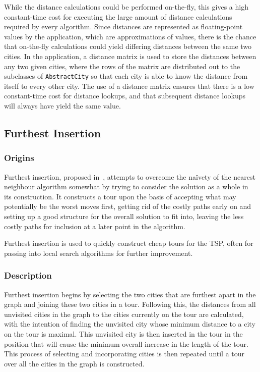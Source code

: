 \documentclass{l4proj}
\begin{document}
While the distance calculations could be performed on-the-fly, this gives a high constant-time cost for executing the large amount 
of distance calculations required by every algorithm. Since distances are represented as floating-point values by the application, 
which are approximations of values, there is the chance that on-the-fly calculations could yield differing distances between the same 
two cities. In the application, a distance matrix is used to store the distances between any two given cities, where the rows of the 
matrix are distributed out to the subclasses of \texttt{AbstractCity} so that each city is able to know the distance from itself to 
every other city. The use of a distance matrix ensures that there is a low constant-time cost for distance lookups, and that subsequent 
distance lookups will always have yield the same value.


\subsection{Furthest Insertion}
\subsubsection{Origins}
Furthest insertion, proposed in~\cite{travelIBM}, attempts to overcome the na\"ivety of the nearest neighbour algorithm somewhat by trying to consider the solution as a whole in its construction. It constructs a tour upon the basis of accepting what may potentially be the worst moves first, getting rid of the costly paths early on and setting up a good structure for the overall solution to fit into, leaving the less costly paths for inclusion at a later point in the algorithm.

Furthest insertion is used to quickly construct cheap tours for the TSP, often for passing into local search algorithms for further improvement.

\subsubsection{Description}
\label{fi_desc}
Furthest insertion begins by selecting the two cities that are furthest apart in the graph and joining these two cities in a tour. Following this, the distances from all unvisited cities in the graph to the cities currently on the tour are calculated, with the intention of finding the unvisited city whose minimum distance to a city on the tour is maximal. This unvisited city is then inserted in the tour in the position that will cause the minimum overall increase in the length of the tour. This process of selecting and incorporating cities is then repeated until a tour over all the cities in the graph is constructed. 
\end{document}
